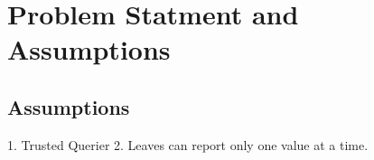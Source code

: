 \chapter{Problem Statment and Assumptions}

\section{Assumptions}
1. Trusted Querier
2. Leaves can report only one value at a time.